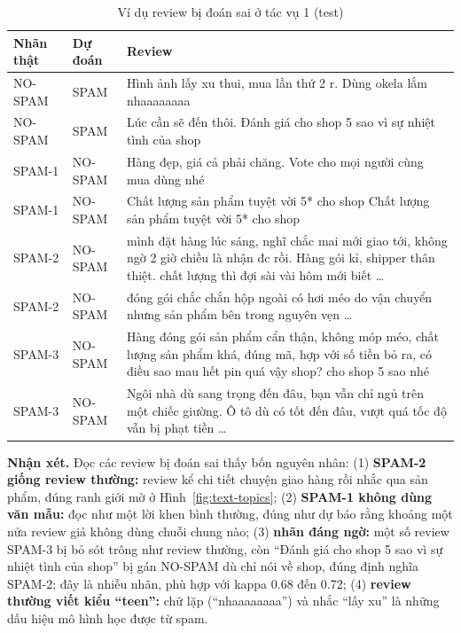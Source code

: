 \begin{table}[H]
\centering
\caption{Ví dụ review bị đoán sai ở tác vụ 1 (test)}
\label{tab:text-errors}
\small
\begin{tabular}{>{\raggedright\arraybackslash}p{1.8cm}>{\raggedright\arraybackslash}p{1.6cm}>{\raggedright\arraybackslash}p{11.0cm}}
\toprule
Nhãn thật & Dự đoán & Review\\
\midrule
NO-SPAM & SPAM & Hình ảnh lấy xu thui, mua lần thứ 2 r. Dùng okela lắm nhaaaaaaaa\\
NO-SPAM & SPAM & Lúc cần sẽ đến thôi. Đánh giá cho shop 5 sao vì sự nhiệt tình của shop\\
SPAM-1 & NO-SPAM & Hàng đẹp, giá cả phải chăng. Vote cho mọi người cùng mua dùng nhé\\
SPAM-1 & NO-SPAM & Chất lượng sản phẩm tuyệt vời 5* cho shop Chất lượng sản phẩm tuyệt vời 5* cho shop\\
SPAM-2 & NO-SPAM & mình đặt hàng lúc sáng, nghĩ chắc mai mới giao tới, không ngờ 2 giờ chiều là nhận đc rồi. Hàng gói kỉ, shipper thân thiệt. chất lượng thì đợi sài vài hôm mới biết \ldots\\
SPAM-2 & NO-SPAM & đóng gói chắc chắn hộp ngoài có hơi méo do vận chuyển nhưng sản phẩm bên trong nguyên vẹn \ldots\\
SPAM-3 & NO-SPAM & Hàng đóng gói sản phẩm cẩn thận, không móp méo, chất lượng sản phẩm khá, đúng mã, hợp với số tiền bỏ ra, có điều sao mau hết pin quá vậy shop? cho shop 5 sao nhé\\
SPAM-3 & NO-SPAM & Ngôi nhà dù sang trọng đến đâu, bạn vẫn chỉ ngủ trên một chiếc giường. Ô tô dù có tốt đến đâu, vượt quá tốc độ vẫn bị phạt tiền \ldots\\
\bottomrule
\end{tabular}
\end{table}

\textbf{Nhận xét.} Đọc các review bị đoán sai thấy bốn nguyên nhân:
(1) \textbf{SPAM-2 giống review thường:} review kể chi tiết chuyện giao hàng rồi nhắc qua sản phẩm, đúng ranh giới mờ ở Hình~\ref{fig:text-topics};
(2) \textbf{SPAM-1 không dùng văn mẫu:} đọc như một lời khen bình thường, đúng như dự báo rằng khoảng một nửa review giả không dùng chuỗi chung nào;
(3) \textbf{nhãn đáng ngờ:} một số review SPAM-3 bị bỏ sót trông như review thường, còn ``Đánh giá cho shop 5 sao vì sự nhiệt tình của shop''
bị gán NO-SPAM dù chỉ nói về shop, đúng định nghĩa SPAM-2; đây là nhiễu nhãn, phù hợp với kappa 0.68 đến 0.72;
(4) \textbf{review thường viết kiểu ``teen'':} chữ lặp (``nhaaaaaaaa'') và nhắc ``lấy xu'' là những dấu hiệu mô hình học được từ spam.

